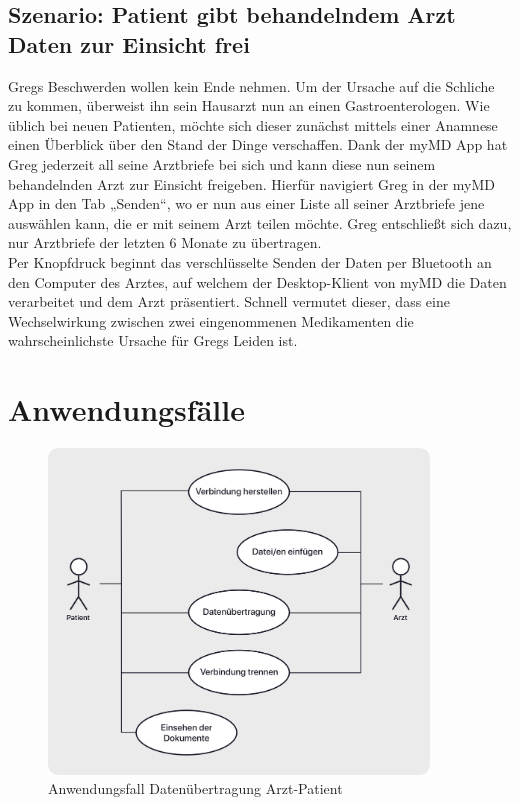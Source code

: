 \documentclass[a4paper]{scrreprt}
\begin{document}
\subsection{Szenario: Patient gibt behandelndem Arzt Daten zur Einsicht frei}
Gregs Beschwerden wollen kein Ende nehmen. Um der Ursache auf die Schliche zu kommen, überweist ihn sein Hausarzt nun an einen Gastroenterologen. Wie üblich bei neuen Patienten, möchte sich dieser zunächst mittels einer Anamnese einen Überblick über den Stand der Dinge verschaffen. Dank der myMD \gls{App} hat Greg jederzeit all seine Arztbriefe bei sich und kann diese nun seinem behandelnden Arzt zur Einsicht freigeben. Hierfür navigiert Greg in der myMD App in den Tab „Senden“, wo er nun aus einer Liste all seiner Arztbriefe jene auswählen kann, die er mit seinem Arzt teilen möchte. Greg entschließt sich dazu, nur Arztbriefe der letzten 6 Monate zu übertragen. \\
Per Knopfdruck beginnt das verschlüsselte Senden der Daten per \gls{Bluetooth} an den Computer des Arztes, auf welchem der Desktop-Klient von myMD die Daten verarbeitet und dem Arzt präsentiert. Schnell vermutet dieser, dass eine Wechselwirkung zwischen zwei eingenommenen Medikamenten die wahrscheinlichste Ursache für Gregs Leiden ist.

\section{Anwendungsfälle}

\begin{figure}
\centering
\includegraphics[width=0.9\textwidth]{AF-ArztPatient}
\caption{Anwendungsfall Datenübertragung Arzt-Patient}
\end{figure}
\end{document}
